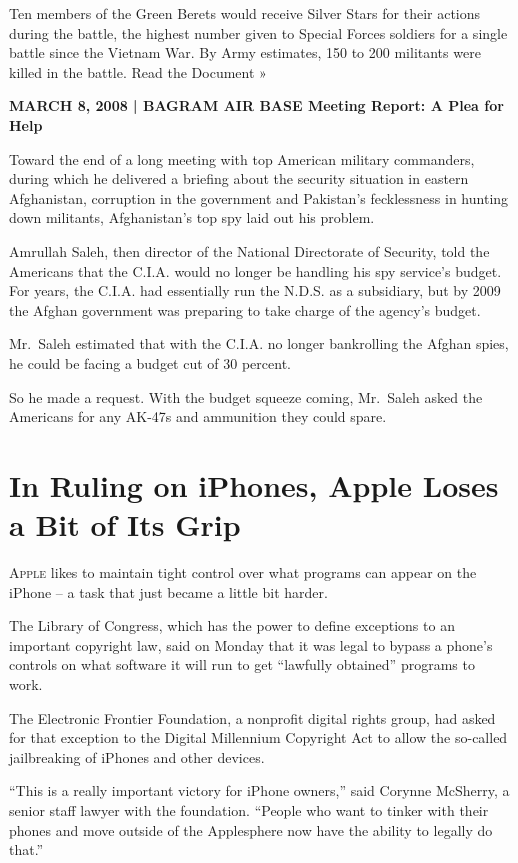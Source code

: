 ﻿\documentclass[12pt]{article}
\begin{document}
Ten members of the Green Berets would receive Silver Stars for their actions during the battle, the
highest number given to Special Forces soldiers for a single battle since the Vietnam War. By Army
estimates, 150 to 200 militants were killed in the battle. Read the Document »

\textbf{MARCH 8, 2008 | BAGRAM AIR BASE Meeting Report: A Plea for Help}

Toward the end of a long meeting with top American military commanders, during which he delivered a
briefing about the security situation in eastern Afghanistan, corruption in the government and
Pakistan's fecklessness in hunting down militants, Afghanistan's top spy laid out his problem.

Amrullah Saleh, then director of the National Directorate of Security, told the Americans that the
C.I.A. would no longer be handling his spy service's budget. For years, the C.I.A. had essentially
run the N.D.S. as a subsidiary, but by 2009 the Afghan government was preparing to take charge of
the agency's budget.

Mr.~Saleh estimated that with the C.I.A. no longer bankrolling the Afghan spies, he could be facing
a budget cut of 30 percent.

So he made a request. With the budget squeeze coming, Mr.~Saleh asked the Americans for any AK-47s
and ammunition they could spare.

\section{In Ruling on iPhones, Apple Loses a Bit of Its Grip}

\lettrine{A}{pple} likes to maintain tight control over what programs can
appear on the iPhone -- a task that just became a little bit harder.

The Library of Congress, which has the power to define exceptions to an important copyright law,
said on Monday that it was legal to bypass a phone's controls on what software it will run to get
``lawfully obtained'' programs to work.

The Electronic Frontier Foundation, a nonprofit digital rights group, had asked for that exception
to the Digital Millennium Copyright Act to allow the so-called jailbreaking of iPhones and other
devices.

``This is a really important victory for iPhone owners,'' said Corynne McSherry, a senior staff
lawyer with the foundation. ``People who want to tinker with their phones and move outside of the
Applesphere now have the ability to legally do that.''
\end{document}
